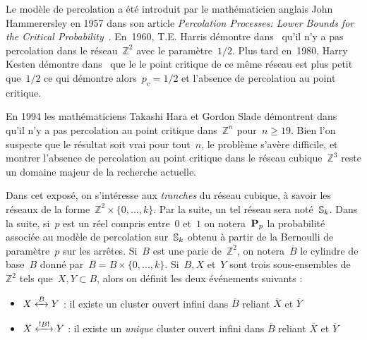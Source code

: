 \vspace*{0.3cm}
	Le modèle de percolation a été introduit par le mathématicien anglais John Hammerersley en 1957 dans son article \emph{Percolation Processes: Lower Bounds for the Critical Probability}~\cite{hammer}. En~1960, T.E. Harris démontre dans~\cite{harris} qu'il n'y a pas percolation dans le réseau~$\mathbb{Z}^2$ avec le paramètre~$1/2$. Plus tard en~1980, Harry Kesten démontre dans~\cite{kesten} que le le point critique de ce même réseau est plus petit que~$1/2$ ce qui démontre alors~$p_c=1/2$ et l'absence de percolation au point critique.
	
	En 1994 les mathématiciens Takashi Hara et Gordon Slade démontrent dans~\cite{mean} qu'il n'y a pas percolation au point critique dans~$\mathbb{Z}^n$ pour~$n\geq 19$. Bien l'on suspecte que le résultat soit vrai pour tout~$n$, le problème s'avère difficile, et montrer l'absence de percolation au point critique dans le réseau cubique~$\mathbb{Z}^3$ reste un domaine majeur de la recherche actuelle.
	
	Dans cet exposé, on s'intéresse aux \emph{tranches} du réseau cubique, à savoir les réseaux de la forme~$\mathbb{Z}^2\times\{0,...,k\}$. Par la suite, un tel réseau sera noté~$\Sk$. \marginnote{$\Sk$}
	Dans la suite, si~$p$ est un réel compris entre~$0$ et~$1$ on notera~$\PpSP$ \marginnote{$\PpSP$} la probabilité associée au modèle de percolation sur~$\Sk$ obtenu à partir de la Bernoulli de paramètre~$p$ sur les arrêtes. Si~$B$ est une parie de~$\mathbb{Z}^2$, on notera~$\overline{B}$  le cylindre de base~$B$ donné par~$\overline{B}=B\times\{0,...,k\}$. 	
	Si~$B, X$ et~$Y$ sont trois sous-ensembles de~$\mathbb{Z}^2$ tels que~$X,Y\subset B$, alors on définit les deux événements suivants :
	\begin{itemize}
		\item[] $\relie[B]{X}{Y}$  : \og{} il existe un cluster ouvert infini dans $\overline{B}$ reliant $\overline{X}$ et $\overline{Y}$  \fg{}
		\item[] $\relie*[B]{X}{Y}$  :  \og{} il existe un \emph{unique} cluster ouvert infini dans $\overline{B}$ reliant $\overline{X}$ et $\overline{Y}$  \fg{}
	\end{itemize}
	